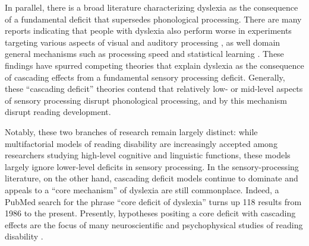 \documentclass[../uwthesis.tex]{subfiles}
\begin{document}
In parallel, there is a broad literature characterizing dyslexia as the consequence of a fundamental deficit that supersedes phonological processing. There are many reports indicating that people with dyslexia also perform worse in experiments targeting various aspects of visual \cite{Stuart2006,Talcott2002}
and auditory processing \cite{Hamalainen2013,Noordenbos2015}, as well domain general mechanisms such as processing speed and statistical learning \cite{Gabay2015,Vandermosten2018StatisticalChildren}. These findings have spurred competing theories that explain dyslexia as the consequence of cascading effects from a fundamental sensory processing deficit. Generally, these “cascading deficit” theories contend that relatively low- or mid-level aspects of sensory processing disrupt phonological processing, and by this mechanism disrupt reading development.

Notably, these two branches of research remain largely distinct: while multifactorial models of reading disability are increasingly accepted among researchers studying high-level cognitive and linguistic functions, these models largely ignore lower-level deficits in sensory processing. In the sensory-processing literature, on the other hand, cascading deficit models continue to dominate and appeals to a “core mechanism” of dyslexia are still commonplace. Indeed, a PubMed search for the phrase “core deficit of dyslexia” turns up 118 results from 1986 to the present. Presently, hypotheses positing a core deficit with cascading effects are the focus of many neuroscientific and psychophysical studies of reading disability \cite{Casini2018ItsDyslexia,Colling2017NeuralStudy,Frey2019BehavioralDyslexia,Frey2019MusicStudy,Gori2016MultipleDyslexia,Krause2015PayDyslexia,Lieder2019PerceptualDyslexia,Nicolson2018ProceduralCommitment,Vidyasagar2019VisualRemediation}.
\end{document}
